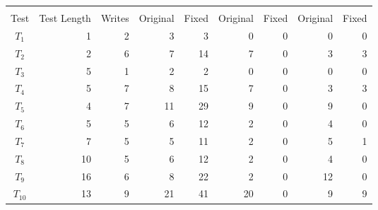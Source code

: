 \newcommand\shardstorecomparisontotaltests{10}

\begin{tabular}{crrrrrrrr}
\toprule
 & & &  &  &  \\
\cmidrule(lr){4-5} \cmidrule(lr){6-7} \cmidrule(lr){8-9}
Test & Test Length & Writes & Original & Fixed & Original & Fixed & Original & Fixed \\
\midrule
$T_{1}$ & 1 & 2 & 3 & 3 & 0 & 0 & 0 & 0 \\ 
$T_{2}$ & 2 & 6 & 7 & 14 & 7 & 0 & 3 & 3 \\ 
$T_{3}$ & 5 & 1 & 2 & 2 & 0 & 0 & 0 & 0 \\ 
$T_{4}$ & 5 & 7 & 8 & 15 & 7 & 0 & 3 & 3 \\ 
$T_{5}$ & 4 & 7 & 11 & 29 & 9 & 0 & 9 & 0 \\ 
$T_{6}$ & 5 & 5 & 6 & 12 & 2 & 0 & 4 & 0 \\ 
$T_{7}$ & 7 & 5 & 5 & 11 & 2 & 0 & 5 & 1 \\ 
$T_{8}$ & 10 & 5 & 6 & 12 & 2 & 0 & 4 & 0 \\ 
$T_{9}$ & 16 & 6 & 8 & 22 & 2 & 0 & 12 & 0 \\ 
$T_{10}$ & 13 & 9 & 21 & 41 & 20 & 0 & 9 & 9 \\ 

\bottomrule
\end{tabular}
